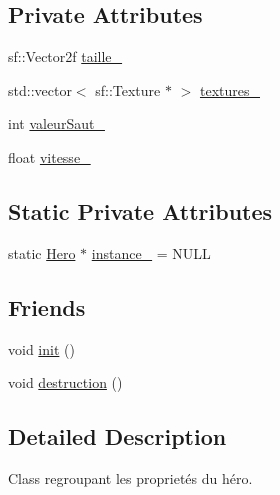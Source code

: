 \subsection*{Private Attributes}
\begin{DoxyCompactItemize}
\item 
sf\-::\-Vector2f \hyperlink{classPropriete_1_1Hero_a0cd5ec1ca2d96f46ebd62a4a96696173}{taille\-\_\-}
\item 
std\-::vector$<$ sf\-::\-Texture $\ast$ $>$ \hyperlink{classPropriete_1_1Hero_a35ff814aef4ef7c70da4cbfc827cf60a}{textures\-\_\-}
\item 
int \hyperlink{classPropriete_1_1Hero_a95aa9ba8572fa1d9fff696ba7317a071}{valeur\-Saut\-\_\-}
\item 
float \hyperlink{classPropriete_1_1Hero_a63cb50c4676afadb7169dd2bd2119a5d}{vitesse\-\_\-}
\end{DoxyCompactItemize}
\subsection*{Static Private Attributes}
\begin{DoxyCompactItemize}
\item 
static \hyperlink{classPropriete_1_1Hero}{Hero} $\ast$ \hyperlink{classPropriete_1_1Hero_a1511a7e0960fe6425770bf30102c6162}{instance\-\_\-} = N\-U\-L\-L
\end{DoxyCompactItemize}
\subsection*{Friends}
\begin{DoxyCompactItemize}
\item 
void \hyperlink{classPropriete_1_1Hero_a02fd73d861ef2e4aabb38c0c9ff82947}{init} ()
\item 
void \hyperlink{classPropriete_1_1Hero_a79af67d84b6605d4aa37501ecd923146}{destruction} ()
\end{DoxyCompactItemize}


\subsection{Detailed Description}
Class regroupant les proprietés du héro. 

